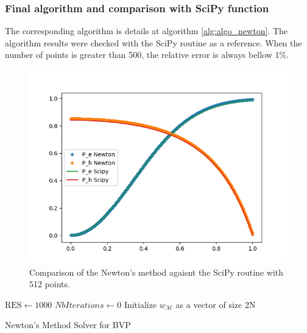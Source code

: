 \documentclass[10pt,a4paper,twocolumn]{article}
\begin{document}
\subsubsection{Final algorithm and comparison with SciPy function}
The corresponding algorithm is details at algorithm \ref{alg:algo_newton}. The algorithm results were checked with the SciPy routine as a reference. When the number of points is greater than 500, the relative error is always bellow 1\%.
\begin{figure}[hbtp]
\caption{Comparison of the Newton's method agaisnt the SciPy routine with 512 points.}
\centering
\includegraphics[scale=0.6]{../pictures/NewtonScipyMetod_epoch_512.png}
\end{figure}

\IncMargin{1em}
\begin{algorithm}[h]
	\BlankLine
	$\text{RES} \leftarrow  1000$ \;
	$NbIterations \leftarrow 0$\;
	Initialize $w_{\mathcal{M}}$ as a vector of size 2N\;
	\BlankLine
	
	
\caption{Newton's Method Solver for BVP}\label{alg:algo_newton}
\end{algorithm}
\DecMargin{1em}
\end{document}
